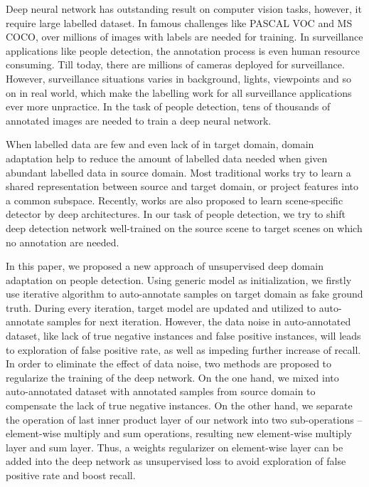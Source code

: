 \documentclass[runningheads]{llncs}
\begin{document}
Deep neural network has outstanding result on computer vision tasks, however, it require large labelled dataset. In famous challenges like PASCAL VOC and MS COCO, over millions of images with labels are needed for training. In surveillance applications like people detection, the annotation process is even human resource consuming. Till today, there are millions of cameras deployed for surveillance. However, surveillance situations varies in background, lights, viewpoints and so on in real world, which make the labelling work for all surveillance applications ever more unpractice. In the task of people detection, tens of thousands of annotated images are needed to train a deep neural network.
\par
When labelled data are few and even lack of in target domain, domain adaptation help to reduce the amount of labelled data needed when given abundant labelled data in source domain. Most traditional works \cite{saenko2010adapting,kulis2011you,gopalan2011domain,huang2006correcting,gretton2009covariate} try to learn a shared representation between source and target domain, or project features into a common subspace. Recently, works are also \cite{wang2014scene,zeng2014deep,hattori2015learning} proposed to learn scene-specific detector by deep architectures. In our task of people detection, we try to shift deep detection network well-trained on the source scene to target scenes on which no annotation are needed.
\par
In this paper, we proposed a new approach of unsupervised deep domain adaptation on people detection. Using generic model as initialization, we firstly use iterative algorithm to auto-annotate samples on target domain as fake ground truth. During every iteration, target model are updated and utilized to auto-annotate samples for next iteration. However, the data noise in auto-annotated dataset, like lack of true negative instances and false positive instances, will leads to exploration of false positive rate, as well as impeding further increase of recall. In order to eliminate the effect of data noise, two methods are proposed to regularize the training of the deep network. On the one hand, we mixed into auto-annotated dataset with annotated samples from source domain to compensate the lack of true negative instances. On the other hand, we separate the operation of last inner product layer of our network into two sub-operations -- element-wise multiply and sum operations, resulting new element-wise multiply layer and sum layer. Thus, a weights regularizer on element-wise layer can be added into the deep network as unsupervised loss to avoid exploration of false positive rate and boost recall.
\end{document}
